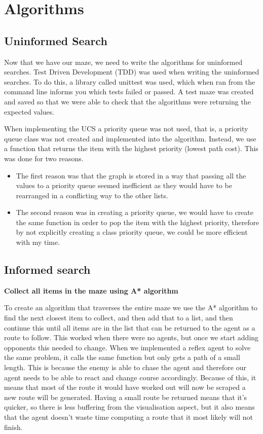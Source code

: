 \documentclass[]{final_report}
\begin{document}
\newpage
\section{Algorithms}

\subsection{Uninformed Search}

Now that we have our maze, we need to write the algorithms for uninformed searches. Test Driven Development (TDD) was used when writing the uninformed searches. To do this, a library called unittest was used, which when ran from the command line informs you which tests failed or passed. A test maze was created and saved so that we were able to check that the algorithms were returning the expected values.

When implementing the UCS a priority queue was not used, that is, a priority queue class was not created and implemented into the algorithm. Instead, we use a function that returns the item with the highest priority (lowest path cost). This was done for two reasons. 
\begin{itemize}
    \item The first reason was that the graph is stored in a way that passing all the values to a priority queue seemed inefficient as they would have to be rearranged in a conflicting way to the other lists.
    \item The second reason was in creating a priority queue, we would have to create the same function in order to pop the item with the highest priority, therefore by not explicitly creating a class priority queue, we could be more efficient with my time.
\end{itemize}

\subsection{Informed search}

\textbf{Collect all items in the maze using A* algorithm}

To create an algorithm that traverses the entire maze we use the A* algorithm to find the next closest item to collect, and then add that to a list, and then continue this until all items are in the list that can be returned to the agent as a route to follow. This worked when there were no agents, but once we start adding opponents this needed to change. When we implemented a reflex agent to solve the same problem, it calls the same function but only gets a path of a small length. This is because the enemy is able to chase the agent and therefore our agent needs to be able to react and change course accordingly. Because of this, it means that most of the route it would have worked out will now be scraped a new route will be generated. Having a small route be returned means that it's quicker, so there is less buffering from the visualisation aspect, but it also means that the agent doesn't waste time computing a route that it most likely will not finish.
\end{document}
